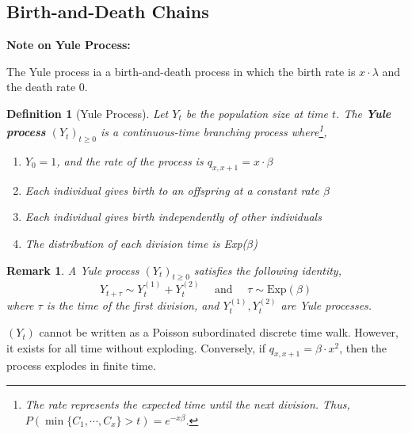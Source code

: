 \documentclass{tufte-handout}
\newtheorem{defn}[thm]{Definition}
\newtheorem{rmk}[thm]{Remark}
\begin{document}
\subsection{Birth-and-Death Chains}
\begin{marginfigure}
  \textbf{Note on Yule Process:}

  \noindent The Yule process ia a birth-and-death process in which the birth rate is $x \cdot \lambda$ and the death rate $0$.
\end{marginfigure}

\begin{defn}[Yule Process]
  Let $Y_t$ be the population size at time $t$. The \textbf{Yule process} $(Y_t)_{t \geq 0}$ is a continuous-time branching process where\footnote{The rate represents the expected time until the next division. Thus, $P(\min \{C_1, \cdots, C_x\} > t) = e^{-x \beta}$.},
  \begin{enumerate}
    \item $Y_0 = 1$, and the rate of the process is $q_{x, x + 1} = x \cdot \beta$
    \item Each individual gives birth to an offspring at a constant rate $\beta$
    \item Each individual gives birth independently of other individuals
    \item The distribution of each division time is Exp($\beta$)
  \end{enumerate}
\end{defn}

\begin{rmk}
  A Yule process $(Y_t)_{t \geq 0}$ satisfies the following identity,
  \[Y_{t + \tau} \sim Y_t^{(1)} + Y_t^{(2)} \quad \text{ and } \quad \tau \sim \text{Exp}(\beta)\]
  \noindent where $\tau$ is the time of the first division, and $Y_t^{(1)}, Y_t^{(2)}$ are Yule processes.
\end{rmk}

\begin{marginfigure}
  $(Y_t)$ cannot be written as a Poisson subordinated discrete time walk. However, it exists for all time without exploding. Conversely, if $q_{x, x+1} = \beta \cdot x^2$, then the process explodes in finite time.
\end{marginfigure}
\end{document}
